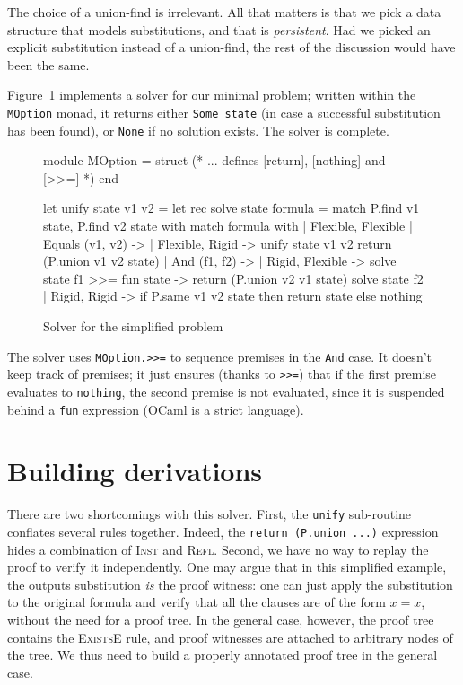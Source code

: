 \documentclass{easychair}
\def\li{\lstinline}
\let\Rule\textsc
\newcommand{\fref}[1]{Figure~\ref{fig:#1}}
\begin{document}
The choice of a union-find is irrelevant. All that matters is that we
pick a data structure that models substitutions, and that is \emph{persistent}.
Had we picked an explicit substitution instead of a union-find, the rest of the
discussion would have been the same.

\fref{solver} implements a solver for our minimal problem; written within the
\li+MOption+ monad, it returns either \li+Some state+ (in case a successful
substitution has been found), or \li+None+ if no solution exists. The solver is
complete.

\begin{figure}
  \centering
  \begin{ocaml}
module MOption = struct
  (* ... defines [return], [nothing] and [>>=] *)
end

let unify state v1 v2 =                         let rec solve state formula =
  match P.find v1 state, P.find v2 state with     match formula with
  | Flexible, Flexible                            | Equals (v1, v2) ->
  | Flexible, Rigid ->                                unify state v1 v2
      return (P.union v1 v2 state)                | And (f1, f2) ->
  | Rigid, Flexible ->                                solve state f1 >>= fun state ->
      return (P.union v2 v1 state)                    solve state f2
  | Rigid, Rigid ->
      if P.same v1 v2 state then
        return state
      else
        nothing
  \end{ocaml}
  \caption{Solver for the simplified problem}
  \label{fig:solver}
\end{figure}

The solver uses \li+MOption.>>=+ to sequence premises in the \li+And+ case. It
doesn't keep track of premises; it just ensures (thanks to \li+>>=+) that if the
first premise evaluates to \li+nothing+, the second premise is not evaluated,
since it is suspended behind a \li+fun+ expression (OCaml is a strict language).

\section{Building derivations}

There are two shortcomings with this solver. First, the \li+unify+ sub-routine
conflates several rules together. Indeed, the \li+return (P.union ...)+
expression hides a combination of \Rule{Inst} and \Rule{Refl}. Second, we
have no way to replay the proof to verify it independently. One may argue that
in this simplified example, the outputs substitution \emph{is} the proof
witness: one can just apply the substitution to the original
formula and verify that all the clauses are of the form $x = x$, without the
need for a proof tree. In the general case, however, the proof tree contains the
\Rule{ExistsE} rule, and proof witnesses are attached to arbitrary nodes of the
tree. We thus need to build a properly annotated proof tree in the general case.
\end{document}
